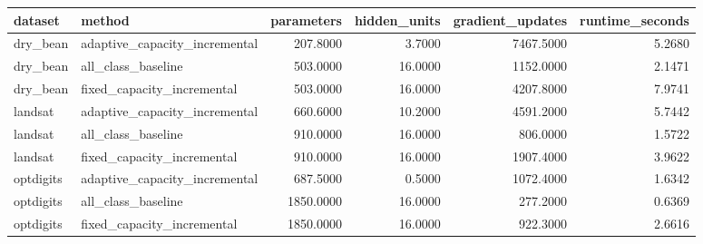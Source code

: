 \begin{tabular}{llrrrr}
\toprule
dataset & method & parameters & hidden\_units & gradient\_updates & runtime\_seconds \\
\midrule
dry\_bean & adaptive\_capacity\_incremental & 207.8000 & 3.7000 & 7467.5000 & 5.2680 \\
dry\_bean & all\_class\_baseline & 503.0000 & 16.0000 & 1152.0000 & 2.1471 \\
dry\_bean & fixed\_capacity\_incremental & 503.0000 & 16.0000 & 4207.8000 & 7.9741 \\
landsat & adaptive\_capacity\_incremental & 660.6000 & 10.2000 & 4591.2000 & 5.7442 \\
landsat & all\_class\_baseline & 910.0000 & 16.0000 & 806.0000 & 1.5722 \\
landsat & fixed\_capacity\_incremental & 910.0000 & 16.0000 & 1907.4000 & 3.9622 \\
optdigits & adaptive\_capacity\_incremental & 687.5000 & 0.5000 & 1072.4000 & 1.6342 \\
optdigits & all\_class\_baseline & 1850.0000 & 16.0000 & 277.2000 & 0.6369 \\
optdigits & fixed\_capacity\_incremental & 1850.0000 & 16.0000 & 922.3000 & 2.6616 \\
\bottomrule
\end{tabular}
